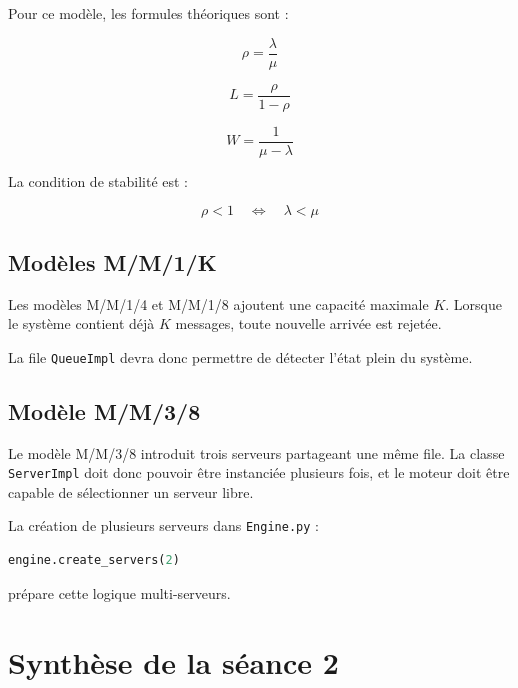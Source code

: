 \documentclass{article}
\begin{document}
Pour ce modèle, les formules théoriques sont :

\[
\rho = \frac{\lambda}{\mu}
\]

\[
L = \frac{\rho}{1-\rho}
\]

\[
W = \frac{1}{\mu-\lambda}
\]

La condition de stabilité est :

\[
\rho < 1
\quad \Longleftrightarrow \quad
\lambda < \mu
\]

\subsection{Modèles M/M/1/K}

Les modèles M/M/1/4 et M/M/1/8 ajoutent une capacité maximale \(K\). Lorsque le système contient déjà \(K\) messages, toute nouvelle arrivée est rejetée.

La file \texttt{QueueImpl} devra donc permettre de détecter l’état plein du système.

\subsection{Modèle M/M/3/8}

Le modèle M/M/3/8 introduit trois serveurs partageant une même file. La classe \texttt{ServerImpl} doit donc pouvoir être instanciée plusieurs fois, et le moteur doit être capable de sélectionner un serveur libre.

La création de plusieurs serveurs dans \texttt{Engine.py} :

\begin{lstlisting}[language=Python]
engine.create_servers(2)
\end{lstlisting}

prépare cette logique multi-serveurs.

\section{Synthèse de la séance 2}
\end{document}

